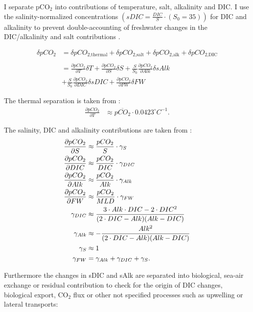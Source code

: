I separate pCO$_2$ into contributions of temperature, salt, alkalinity and DIC. I use the salinity-normalized concentrations $(sDIC=\frac{DIC}{S}\cdot (S_0=35))$ for DIC and alkalinity to prevent double-accounting of freshwater changes in the DIC/alkalinity and salt contributions \citep{Keeling2004}.

\begin{align*}
\delta pCO_2&=\delta pCO_{\text{2,thermal}}+\delta pCO_{\text{2,salt}}+\delta pCO_{\text{2,alk}}+\delta pCO_{\text{2,DIC}} \\ \\
&= \frac{\partial pCO_2}{\partial T}\delta T + \frac{\partial pCO_2}{\partial S}\delta S  + \frac{S}{S_0}\frac{\partial pCO_2}{\partial Alk}\delta sAlk  \\ &+ \frac{S}{S_0}\frac{\partial pCO_2}{\partial DIC}\delta sDIC + \frac{\partial pCO_2}{\partial FW}\delta FW 
\end{align*}

\noindent The thermal separation is taken from \cite{Takahashi1993}:
\begin{align*}
\frac{\partial pCO_2}{\partial T} &\approx \overline{pCO_2} \cdot 0.0423 ^\circ C^{-1}  .
\end{align*}

\noindent The salinity, DIC and alkalinity contributions are taken from \cite{Sarmiento2006}:
\begin{align*}
\allowdisplaybreaks
\frac{\partial pCO_2}{\partial S} &\approx \frac{pCO_2}{S} \cdot \gamma_{S}  \\
\frac{\partial pCO_2}{\partial DIC} &\approx \frac{pCO_2}{DIC} \cdot \gamma_{DIC} \\
\frac{\partial pCO_2}{\partial Alk} &\approx \frac{pCO_2}{Alk} \cdot \gamma_{Alk} \\
\frac{\partial pCO_2}{\partial FW} &\approx \frac{pCO_2}{MLD} \cdot \gamma_{FW} \\
\gamma_{DIC} &\approx \frac{3 \cdot Alk \cdot DIC - 2 \cdot DIC^2}{(2 \cdot DIC - Alk)(Alk-DIC)} \\
\gamma_{Alk} &\approx -\frac{Alk^2}{(2 \cdot DIC - Alk)(Alk-DIC)} \\
\gamma_{S} &\approx 1 \\
\gamma_{FW}&=\gamma_{Alk}+\gamma_{DIC}+\gamma_{S}.
\end{align*}

\noindent Furthermore the changes in sDIC and sAlk are separated into biological, sea-air exchange or residual contribution to check for the origin of \acs{DIC} changes, \ie biological export, CO$_2$ flux or other not specified processes such as upwelling or lateral transports:

